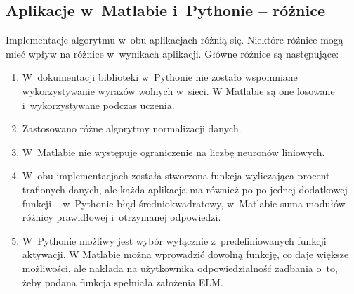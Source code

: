 \documentclass{article}
\begin{document}
\subsection{Aplikacje w~Matlabie i~Pythonie -- różnice}
\label{porownanie_aplikacji}
Implementacje algorytmu w~obu aplikacjach różnią się. 
Niektóre różnice mogą mieć wpływ na różnice w~wynikach aplikacji.
Główne różnice są następujące:
\begin{enumerate}
\item W~dokumentacji biblioteki w~Pythonie nie zostało wspomniane wykorzystywanie wyrazów wolnych w~sieci.
W Matlabie są one losowane i~wykorzystywane podczas uczenia.
\item Zastosowano różne algorytmy normalizacji danych.
\item W~Matlabie nie występuje ograniczenie na liczbę neuronów liniowych.
\item W~obu implementacjach została stworzona funkcja wyliczająca procent trafionych danych, ale każda aplikacja ma również po po jednej dodatkowej funkcji -- w~Pythonie błąd średniokwadratowy, w~Matlabie suma modułów różnicy prawidłowej i~otrzymanej odpowiedzi.
\item W~Pythonie możliwy jest wybór wyłącznie z~predefiniowanych funkcji aktywacji. 
W Matlabie można wprowadzić dowolną funkcję, co daje większe możliwości, ale nakłada na użytkownika odpowiedzialność zadbania o~to, żeby podana funkcja spełniała założenia ELM.
\end{enumerate}
\end{document}
